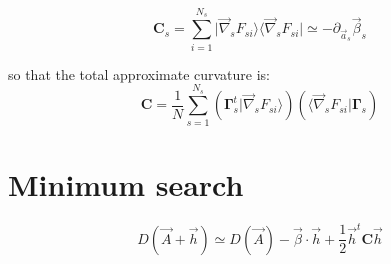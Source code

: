 \documentclass[aps,12pt]{revtex4}
\begin{document}
\begin{equation}
	\bm{C}_s = \sum_{i=1}^{N_s} \vert \vec{\nabla}_s F_{si} \rangle  \langle \vec{\nabla}_s F_{si} \vert \simeq -\partial_{\vec{a}_s} \vec{\beta}_s 
\end{equation}

so that the total approximate curvature is:
\begin{equation}
	\bm{C} =  \dfrac{1}{N} \sum_{s=1}^{N_s} \left(  \bm{\Gamma}_s^t \vert \vec{\nabla}_s F_{si} \rangle\right) \left( \langle \vec{\nabla}_s F_{si} \vert \bm{\Gamma}_s\right)
\end{equation}


\section{Minimum search}

\begin{equation}
	D(\vec{A} + \vec{h}) \simeq D(\vec{A}) - \vec{\beta} \cdot \vec{h} + \dfrac{1}{2} \vec{h}^t \bm{C} \vec{h}
\end{equation}
\end{document}
